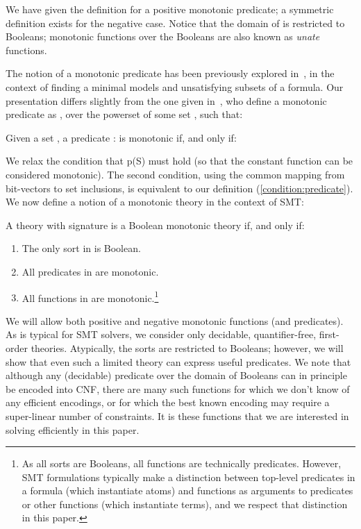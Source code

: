 \documentclass[runningheads]{llncs}
\begin{document}
We have given the definition for a positive monotonic predicate; a symmetric definition exists for the negative case. Notice that the domain of  is restricted to Booleans; monotonic functions over the Booleans are also known as \textit{unate} functions. 

The notion of a monotonic predicate has been previously explored in~\cite{bradley2007checking,bradley2008property,marques2013minimal}, in the context of finding a minimal models and unsatisfying subsets of a formula. Our presentation differs slightly from the one given in~\cite{bradley2007checking,bradley2008property,marques2013minimal}, who define a monotonic predicate as , over the powerset of some set , such that: 

\begin{definition}
Given a set , a predicate  :  is monotonic if, and only if:

\end{definition}

We relax the condition that p(S) must hold (so that the constant function  can be considered monotonic). The second condition, using the common mapping from bit-vectors to set inclusions, is equivalent to our definition (\ref{condition:predicate}). We now define a notion of a monotonic theory in the context of SMT:

\begin{definition}
A theory  with signature  is a Boolean monotonic theory if, and only if:
\begin{enumerate}
\item\label{condition:boolean}   The only sort in  is Boolean.
\item\label{condition:mono}   All predicates  in  are monotonic.   
\item\label{condition:function}   All functions in  are monotonic.\footnote{As all sorts are Booleans, all functions are technically predicates. However, SMT formulations typically make a distinction between top-level predicates in a formula (which instantiate atoms) and functions as arguments to predicates or other functions (which instantiate terms), and we respect that distinction in this paper.}  
\end{enumerate}
\end{definition}

We will allow both positive and negative monotonic functions (and predicates). As is typical for SMT solvers, we consider only decidable,
quantifier-free, first-order theories. Atypically, the sorts are restricted to Booleans; however, we will show that even such a limited theory can express useful predicates. We note that although any (decidable) predicate over the domain of Booleans can in principle be encoded into CNF, there are many such functions for which we don't know of any efficient encodings, or for which the best known encoding may require a super-linear number of constraints. It is these functions that we are interested in solving efficiently in this paper.
\end{document}
